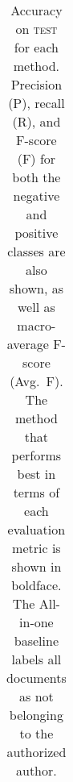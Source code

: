 \documentclass[11pt]{article}
\newcommand\test{\textsc{test}\xspace}
\begin{document}
\begin{table}
\begin{center}
\begin{tabular}{|l|c|ccc|cccc|}
\hline
\hline
\end{tabular}
\caption{Accuracy on \test for each method. Precision (P), recall (R),
  and F-score (F) for both the negative and positive classes are also
  shown, as well as macro-average F-score (Avg.\ F). The method that
  performs best in terms of each evaluation metric is shown in
  boldface. The All-in-one baseline labels all documents as not belonging to the authorized author. \label{results}}
\end{center}
\end{table}




\end{document}

